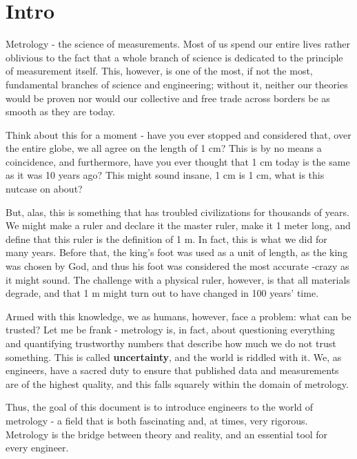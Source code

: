 \section{Intro}
Metrology - the science of measurements. Most of us spend our entire lives rather oblivious to the fact that a whole branch of science is dedicated to the principle of measurement itself. This, however, is one of the most, if not the most, fundamental branches of science and engineering; without it, neither our theories would be proven nor would our collective and free trade across borders be as smooth as they are today.

Think about this for a moment - have you ever stopped and considered that, over the entire globe, we all agree on the length of 1 cm? This is by no means a coincidence, and furthermore, have you ever thought that 1 cm today is the same as it was 10 years ago? This might sound insane, 1 cm is 1 cm, what is this nutcase on about?

But, alas, this is something that has troubled civilizations for thousands of years. We might make a ruler and declare it the master ruler, make it 1 meter long, and define that this ruler is the definition of 1 m. In fact, this is what we did for many years. Before that, the king's foot was used as a unit of length, as the king was chosen by God, and thus his foot was considered the most accurate -crazy as it might sound. The challenge with a physical ruler, however, is that all materials degrade, and that 1 m might turn out to have changed in 100 years' time.

Armed with this knowledge, we as humans, however, face a problem: what can be trusted? Let me be frank - metrology is, in fact, about questioning everything and quantifying trustworthy numbers that describe how much we do not trust something. This is called \textbf{uncertainty}, and the world is riddled with it. We, as engineers, have a sacred duty to ensure that published data and measurements are of the highest quality, and this falls squarely within the domain of metrology.

Thus, the goal of this document is to introduce engineers to the world of metrology - a field that is both fascinating and, at times, very rigorous. Metrology is the bridge between theory and reality, and an essential tool for every engineer.
